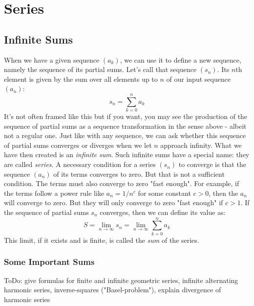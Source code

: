 \section{Series}

\subsection{Infinite Sums}
When we have a given sequence $(a_k)$, we can use it to define a new sequence, namely the sequence of its partial sums. Let's call that sequence $(s_n)$. Its $n$th element is given by the sum over all elements up to $n$ of our input sequence $(a_n)$:
\begin{equation}
 s_n = \sum_{k=0}^n a_k
\end{equation}
It's not often framed like this but if you want, you may see the production of the sequence of partial sums as a sequence transformation in the sense above - albeit not a regular one. Just like with any sequence, we can ask whether this sequence of partial sums converges or diverges when we let $n$ approach infinity. What we have then created is an \emph{infinite sum}. Such infinite sums have a special name: they are called \emph{series}. A necessary condition for a series $(s_n)$ to converge is that the sequence $(a_n)$ of its terms converges to zero. But that is not a sufficient condition. The terms must also converge to zero "fast enough". For example, if the terms follow a power rule like $a_n = 1 / n^c$ for some constant $c > 0$, then the $a_n$ will converge to zero. But they will only converge to zero "fast enough" if $c > 1$. If the sequence of partial sums $s_n$ converges, then we can define its value as:
\begin{equation}
 S = \lim_{n \rightarrow \infty} s_n = \lim_{n \rightarrow \infty} \sum_{k=0}^n a_k
\end{equation}
This limit, if it exists and is finite, is called the \emph{sum} of the series. 



\subsubsection{Some Important Sums}
ToDo: give formulas for finite and infinite geometric series, infinite alternating harmonic series, inverse-squares ("Basel-problem"), explain divergence of harmonic series

